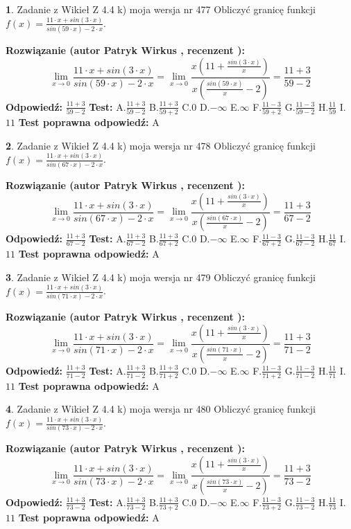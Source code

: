 \documentclass[12pt, a4paper]{article}
\theoremstyle{definition} %
\newtheorem{zad}{}
\newcommand{\zadStart}[1]{\begin{zad}#1\newline}
\newcommand{\zadStop}{\end{zad}}
\newcommand{\rozwStart}[2]{\noindent \textbf{Rozwiązanie (autor #1 , recenzent #2): }\newline}
\newcommand{\rozwStop}{\newline}
\newcommand{\odpStart}{\noindent \textbf{Odpowiedź:}\newline}
\newcommand{\odpStop}{\newline}
\newcommand{\testStart}{\noindent \textbf{Test:}\newline}
\newcommand{\testStop}{\newline}
\newcommand{\kluczStart}{\noindent \textbf{Test poprawna odpowiedź:}\newline}
\newcommand{\kluczStop}{\newline}
\begin{document}
\zadStart{Zadanie z Wikieł Z 4.4 k) moja wersja nr 477}
Obliczyć granicę funkcji $f(x)=\frac{11\cdot x +sin(3\cdot x)}{sin(59\cdot x) -2\cdot x}$.
\zadStop
\rozwStart{Patryk Wirkus}{}
$$\lim\limits_{x\to 0}\frac{11\cdot x +sin(3\cdot x)}{sin(59\cdot x) -2\cdot x}
=\lim\limits_{x\to 0}\frac{x(11+\frac{sin(3\cdot x)}{x})}{x(\frac{sin(59\cdot x)}{x}-2)}
=\frac{11+3}{59-2}$$
\rozwStop
\odpStart
$\frac{11+3}{59-2}$
\odpStop
\testStart
A.$\frac{11+3}{59-2}$
B.$\frac{11+3}{59+2}$
C.$0$
D.$-\infty$
E.$\infty$
F.$\frac{11-3}{59+2}$
G.$\frac{11-3}{59-2}$
H.$\frac{11}{59}$
I.$11$
\testStop
\kluczStart
A
\kluczStop



\zadStart{Zadanie z Wikieł Z 4.4 k) moja wersja nr 478}
Obliczyć granicę funkcji $f(x)=\frac{11\cdot x +sin(3\cdot x)}{sin(67\cdot x) -2\cdot x}$.
\zadStop
\rozwStart{Patryk Wirkus}{}
$$\lim\limits_{x\to 0}\frac{11\cdot x +sin(3\cdot x)}{sin(67\cdot x) -2\cdot x}
=\lim\limits_{x\to 0}\frac{x(11+\frac{sin(3\cdot x)}{x})}{x(\frac{sin(67\cdot x)}{x}-2)}
=\frac{11+3}{67-2}$$
\rozwStop
\odpStart
$\frac{11+3}{67-2}$
\odpStop
\testStart
A.$\frac{11+3}{67-2}$
B.$\frac{11+3}{67+2}$
C.$0$
D.$-\infty$
E.$\infty$
F.$\frac{11-3}{67+2}$
G.$\frac{11-3}{67-2}$
H.$\frac{11}{67}$
I.$11$
\testStop
\kluczStart
A
\kluczStop



\zadStart{Zadanie z Wikieł Z 4.4 k) moja wersja nr 479}
Obliczyć granicę funkcji $f(x)=\frac{11\cdot x +sin(3\cdot x)}{sin(71\cdot x) -2\cdot x}$.
\zadStop
\rozwStart{Patryk Wirkus}{}
$$\lim\limits_{x\to 0}\frac{11\cdot x +sin(3\cdot x)}{sin(71\cdot x) -2\cdot x}
=\lim\limits_{x\to 0}\frac{x(11+\frac{sin(3\cdot x)}{x})}{x(\frac{sin(71\cdot x)}{x}-2)}
=\frac{11+3}{71-2}$$
\rozwStop
\odpStart
$\frac{11+3}{71-2}$
\odpStop
\testStart
A.$\frac{11+3}{71-2}$
B.$\frac{11+3}{71+2}$
C.$0$
D.$-\infty$
E.$\infty$
F.$\frac{11-3}{71+2}$
G.$\frac{11-3}{71-2}$
H.$\frac{11}{71}$
I.$11$
\testStop
\kluczStart
A
\kluczStop



\zadStart{Zadanie z Wikieł Z 4.4 k) moja wersja nr 480}
Obliczyć granicę funkcji $f(x)=\frac{11\cdot x +sin(3\cdot x)}{sin(73\cdot x) -2\cdot x}$.
\zadStop
\rozwStart{Patryk Wirkus}{}
$$\lim\limits_{x\to 0}\frac{11\cdot x +sin(3\cdot x)}{sin(73\cdot x) -2\cdot x}
=\lim\limits_{x\to 0}\frac{x(11+\frac{sin(3\cdot x)}{x})}{x(\frac{sin(73\cdot x)}{x}-2)}
=\frac{11+3}{73-2}$$
\rozwStop
\odpStart
$\frac{11+3}{73-2}$
\odpStop
\testStart
A.$\frac{11+3}{73-2}$
B.$\frac{11+3}{73+2}$
C.$0$
D.$-\infty$
E.$\infty$
F.$\frac{11-3}{73+2}$
G.$\frac{11-3}{73-2}$
H.$\frac{11}{73}$
I.$11$
\testStop
\kluczStart
A
\kluczStop
\end{document}
